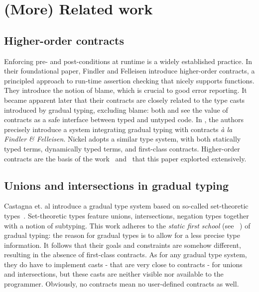 \documentclass[sigplan,10pt,review,anonymous]{acmart}
\newcommand{\unsure}[2][1=]{}
\newcommand{\info}[2][1=]{}
\begin{document}
\section{(More) Related work}
\label{sec:related-work}
\info{Including a mention of statically typed systems with union}

\unsure{WARNING: what is below is being reworked by Yann}

\subsection{Higher-order contracts}

Enforcing pre- and post-conditions at runtime is a widely established practice.
In their foundational paper\cite{FindlerFelleisenHOContracts}, Findler and
Felleisen introduce higher-order contracts, a principled approach to run-time
assertion checking that nicely supports functions. They introduce the notion of
blame, which is crucial to good error reporting. It became apparent later that
their contracts are closely related to the type casts introduced by gradual
typing, excluding blame: both \cite{FindlerMultiLang} and
\cite{FelleisenInterLang} see the value of contracts as a safe interface between
typed and untyped code. In \cite{WellTypedBlamed}, the authors precisely
introduce a system integrating gradual typing with contracts \textit{à la
Findler \& Felleisen}. Nickel adopts a similar type system, with both statically
typed terms, dynamically typed terms, and first-class contracts. Higher-order
contracts are the basis of the work~\cite{KeilThiemannUnionIntersection}
and~\cite{RootCauseOfBlame} that this paper explorted extensively.

\subsection{Unions and intersections in gradual typing}

Castagna et. al \cite{gradualCastagna} introduce a gradual type system based on
so-called set-theoretic types~\cite{SetTheoreticTypes}.  Set-theoretic types
feature unions, intersections, negation types together with a notion of
subtyping. This work adheres to the \emph{static first school} (see
~\cite{practiceTheoryGrad}) of gradual typing: the reason for gradual types is
to allow for a less precise type information. It follows that their goals and
constraints are somehow different, resulting in the absence of first-class
contracts. As for any gradual type system, they do have to implement casts -
that are very close to contracts - for unions and intersections, but these casts
are neither visible nor available to the programmer. Obviously, no contracts
mean no user-defined contracts as well.
\end{document}
